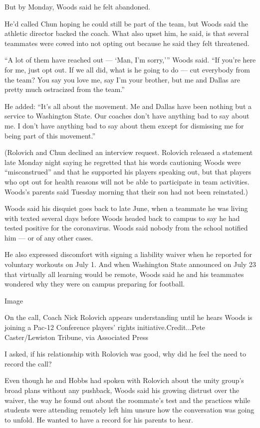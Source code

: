 But by Monday, Woods said he felt abandoned.

He'd called Chun hoping he could still be part of the team, but Woods
said the athletic director backed the coach. What also upset him, he
said, is that several teammates were cowed into not opting out because
he said they felt threatened.

``A lot of them have reached out --- `Man, I'm sorry,''' Woods said.
``If you're here for me, just opt out. If we all did, what is he going
to do --- cut everybody from the team? You say you love me, say I'm your
brother, but me and Dallas are pretty much ostracized from the team.''

He added: ``It's all about the movement. Me and Dallas have been nothing
but a service to Washington State. Our coaches don't have anything bad
to say about me. I don't have anything bad to say about them except for
dismissing me for being part of this movement.''

(Rolovich and Chun declined an interview request. Rolovich released a
statement late Monday night saying he regretted that his words
cautioning Woods were ``misconstrued'' and that he supported his players
speaking out, but that players who opt out for health reasons will not
be able to participate in team activities. Woods's parents said Tuesday
morning that their son had not been reinstated.)

Woods said his disquiet goes back to late June, when a teammate he was
living with texted several days before Woods headed back to campus to
say he had tested positive for the coronavirus. Woods said nobody from
the school notified him --- or of any other cases.

He also expressed discomfort with signing a liability waiver when he
reported for voluntary workouts on July 1. And when Washington State
announced on July 23 that virtually all learning would be remote, Woods
said he and his teammates wondered why they were on campus preparing for
football.

Image

On the call, Coach Nick Rolovich appears understanding until he hears
Woods is joining a Pac-12 Conference players' rights
initiative.Credit...Pete Caster/Lewiston Tribune, via Associated Press

I asked, if his relationship with Rolovich was good, why did he feel the
need to record the call?

Even though he and Hobbs had spoken with Rolovich about the unity
group's broad plans without any pushback, Woods said his growing
distrust over the waiver, the way he found out about the roommate's test
and the practices while students were attending remotely left him unsure
how the conversation was going to unfold. He wanted to have a record for
his parents to hear.

